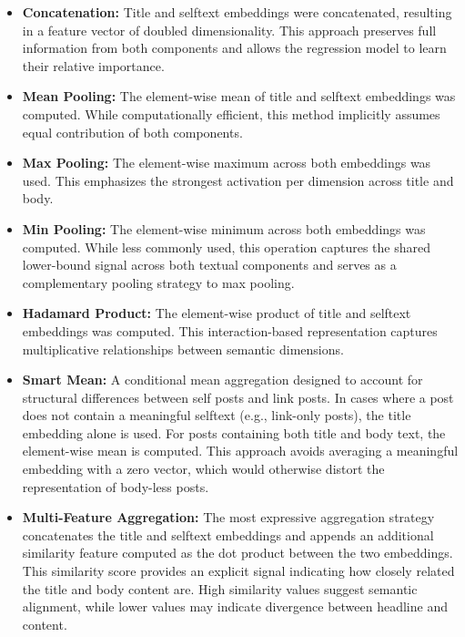 \begin{itemize}
    \item \textbf{Concatenation:} Title and selftext embeddings were concatenated, resulting in a feature vector of doubled dimensionality. This approach preserves full information from both components and allows the regression model to learn their relative importance.

    \item \textbf{Mean Pooling:} The element-wise mean of title and selftext embeddings was computed. While computationally efficient, this method implicitly assumes equal contribution of both components.

    \item \textbf{Max Pooling:}  
    The element-wise maximum across both embeddings was used. This emphasizes the strongest activation per dimension across title and body.

    \item \textbf{Min Pooling:}  
    The element-wise minimum across both embeddings was computed. While less commonly used, this operation captures the shared lower-bound signal across both textual components and serves as a complementary pooling strategy to max pooling.

    \item \textbf{Hadamard Product:} The element-wise product of title and selftext embeddings was computed. This interaction-based representation captures multiplicative relationships between semantic dimensions.

    \item \textbf{Smart Mean:} A conditional mean aggregation designed to account for structural differences between self posts and link posts. In cases where a post does not contain a meaningful selftext (e.g., link-only posts), the title embedding alone is used. For posts containing both title and body text, the element-wise mean is computed. This approach avoids averaging a meaningful embedding with a zero vector, which would otherwise distort the representation of body-less posts.

    \item \textbf{Multi-Feature Aggregation:} The most expressive aggregation strategy concatenates the title and selftext embeddings and appends an additional similarity feature computed as the dot product between the two embeddings. This similarity score provides an explicit signal indicating how closely related the title and body content are. High similarity values suggest semantic alignment, while lower values may indicate divergence between headline and content.
\end{itemize}

